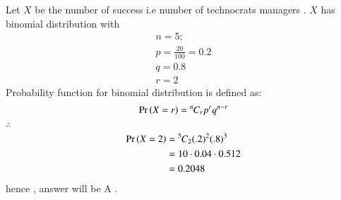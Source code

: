 Let $X$ be the number of success i.e number of technocrats managers . $X$ has binomial distribution with
\begin{align}
    n = 5;\\
    p = \frac{20}{100} = 0.2\\
    q = 0.8\\
    r = 2  
\end{align}
Probability function for binomial distribution is defined as:
\begin{align}
\Pr\left(X = r\right)   =  {{}^{n}\mkern-1muC_{r}} p^r q^{n-r}
\end{align}
$\therefore$
\begin{align}
    \Pr\left(X = 2\right) & = {{}^{5}\mkern-1muC_{2}} (.2)^2 (.8)^3\\
               & = 10 \cdot 0.04 \cdot 0.512\\
               & = 0.2048
\end{align}
hence , answer will be \brak A .